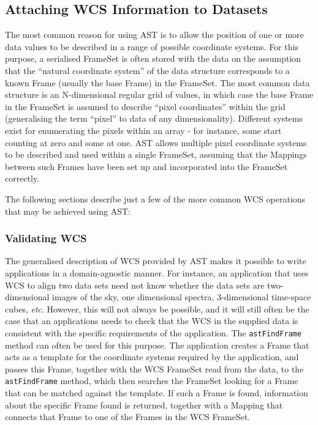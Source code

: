 \documentclass[final,authoryear,5p,times,twocolumn]{elsarticle}
\begin{document}
\subsection{Attaching WCS Information to Datasets}
The most common reason for using AST is to allow the position of one or
more data values to be described in a range of possible coordinate
systems. For this purpose, a serialised FrameSet is often stored with the
data on the assumption that the ``natural coordinate system'' of the data
structure corresponds to a known Frame (usually the base Frame) in the
FrameSet. The most common data structure is an N-dimensional regular grid
of values, in which case the base Frame in the FrameSet is assumed to describe
``pixel coordinates'' within the grid (generalising the term ``pixel'' to
data of any dimensionality). Different systems exist for enumerating the
pixels within an array - for instance, some start counting at zero and
some at one. AST allows multiple pixel coordinate systems to be described
and used within a single FrameSet, assuming that the Mappings between
such Frames have been set up and incorporated into the FrameSet correctly.

The following sections describe just a few of the more common WCS
operations that may be achieved using AST:

\subsubsection{Validating WCS}
The generalised description of WCS provided by AST makes it possible
to write applications in a domain-agnostic manner. For instance, an
application that uses WCS to align two data sets need not know whether the
data sets are two-dimensional images of the sky, one dimensional spectra,
3-dimensional time-space cubes, \emph{etc}. However, this will not always
be possible, and it will still often be the case that an applications needs
to check that the WCS in the supplied data is consistent with the
specific requirements of the application. The \texttt{astFindFrame} method can
often be used for this purpose. The application creates a Frame that acts
as a template for the coordinate systems required by the application,
and passes this Frame, together with the WCS FrameSet read from the data,
to the \texttt{astFindFrame} method, which then searches the FrameSet looking for
a Frame that can be matched against the template. If such a Frame is
found, information about the specific Frame found is returned, together
with a Mapping that connects that Frame to one of the Frames in the WCS
FrameSet.
\end{document}
